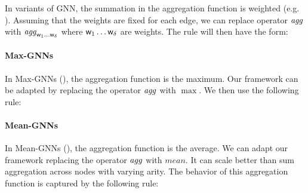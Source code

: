 In variants of GNN, the summation in the aggregation function is weighted (e.g. \cite{DBLP:conf/iclr/VelickovicCCRLB18}). Assuming that the weights are fixed for each edge, we can replace operator $\agg$ with $\agg_{\textsf w_1\dots \textsf w_\delta}$ where  $\textsf w_1\dots \textsf w_\delta$ are weights. The rule will then have the form:
\begin{prooftree}
\end{prooftree}

\paragraph{Max-GNNs}

In Max-GNNs (\cite{DBLP:conf/kr/CucalaG24}), the aggregation function is the maximum. Our framework can be adapted by replacing the operator $\agg$ with $\max$. We then use the following rule:
\begin{prooftree}
\end{prooftree}

\paragraph{Mean-GNNs}

In Mean-GNNs (\cite{RosenbluthTG23}), the aggregation function is the average. We can adapt our framework replacing the operator $\agg$ with $mean$.
It can scale better than sum aggregation across nodes with varying arity. 
The behavior of this aggregation function is captured by the following rule:
\begin{prooftree}
\end{prooftree}

